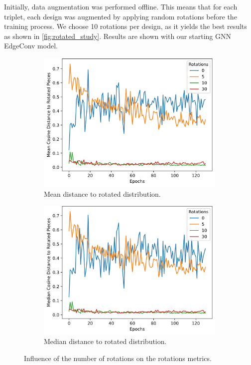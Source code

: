 Initially, data augmentation was performed offline. This means that for each triplet, each design was augmented by applying random rotations before the training process. We choose 10 rotations per design, as it yields the best results as shown in \autoref{fig:rotated_study}. Results are shown with our starting GNN EdgeConv model.
\begin{figure}[]
    \begin{subfigure}[h]{0.5\linewidth}
        \includegraphics[width=\columnwidth]{images/mean_rotated_study.png}
        \caption{Mean distance to rotated distribution.}
        \label{fig:mean_rotated_study}
    \end{subfigure}
    \hfill
    \begin{subfigure}[h]{0.5\linewidth}
        \includegraphics[width=\columnwidth]{images/median_rotated_study.png}
        \caption{Median distance to rotated distribution.}
        \label{fig:median_rotated_study}
    \end{subfigure}
    \caption{Influence of the number of rotations on the rotations metrics.}
    \label{fig:rotated_study}
\end{figure}

